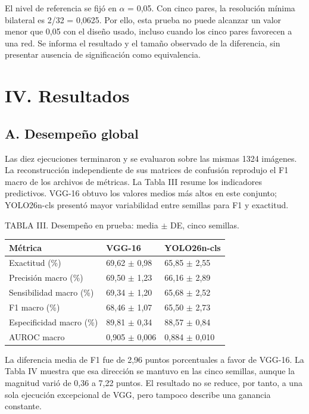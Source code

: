 \documentclass[conference]{IEEEtran}
\begin{document}
El nivel de referencia se fijó en $\alpha$ = 0,05. Con cinco pares, la resolución mínima bilateral es 2/32 = 0,0625. Por ello, esta prueba no puede alcanzar un valor menor que 0,05 con el diseño usado, incluso cuando los cinco pares favorecen a una red. Se informa el resultado y el tamaño observado de la diferencia, sin presentar ausencia de significación como equivalencia.

\newpage
\section*{IV. Resultados}
\subsection*{A. Desempeño global}
Las diez ejecuciones terminaron y se evaluaron sobre las mismas 1324 imágenes. La reconstrucción independiente de sus matrices de confusión reprodujo el F1 macro de los archivos de métricas. La Tabla III resume los indicadores predictivos. VGG-16 obtuvo los valores medios más altos en este conjunto; YOLO26n-cls presentó mayor variabilidad entre semillas para F1 y exactitud.

\begin{center}\small
TABLA III. Desempeño en prueba: media $\pm$ DE, cinco semillas.\par\medskip
\begin{tabular}{lll}
\toprule
Métrica & VGG-16 & YOLO26n-cls\\\midrule
Exactitud (\%) & 69,62 $\pm$ 0,98 & 65,85 $\pm$ 2,55\\
Precisión macro (\%) & 69,50 $\pm$ 1,23 & 66,16 $\pm$ 2,89\\
Sensibilidad macro (\%) & 69,34 $\pm$ 1,20 & 65,68 $\pm$ 2,52\\
F1 macro (\%) & 68,46 $\pm$ 1,07 & 65,50 $\pm$ 2,73\\
Especificidad macro (\%) & 89,81 $\pm$ 0,34 & 88,57 $\pm$ 0,84\\
AUROC macro & 0,905 $\pm$ 0,006 & 0,884 $\pm$ 0,010\\
\bottomrule\end{tabular}\end{center}
La diferencia media de F1 fue de 2,96 puntos porcentuales a favor de VGG-16. La Tabla IV muestra que esa dirección se mantuvo en las cinco semillas, aunque la magnitud varió de 0,36 a 7,22 puntos. El resultado no se reduce, por tanto, a una sola ejecución excepcional de VGG, pero tampoco describe una ganancia constante.
\end{document}
